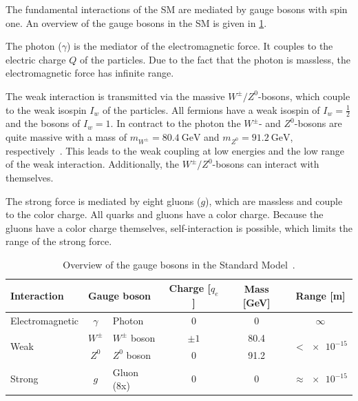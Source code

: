 The fundamental interactions of the SM are mediated by gauge bosons with spin one.
An overview of the gauge bosons in the SM is given in \cref{tab:theory:bosons}.

The photon ($\gamma$) is the mediator of the electromagnetic force.
It couples to the electric charge $Q$ of the particles.
Due to the fact that the photon is massless, the electromagnetic force has infinite range.

The weak interaction is transmitted via the massive $W^\pm/Z^0$-bosons, which couple to the weak isospin $I_w$ of the particles.
All fermions have a weak isospin of $I_w = \frac{1}{2}$ and the bosons of  $I_w = 1$.
In contract to the photon the $W^\pm$- and $Z^0$-bosons are quite massive with a mass of $m_{W^\pm} = \SI{80.4}{\GeV}$ and
$m_{Z^0} = \SI{91.2}{\GeV}$, respectively~\cite{PDG}.
This leads to the weak coupling at low energies and the low range of the weak interaction.
Additionally, the $W^\pm/Z^0$-bosons can interact with themselves.

The strong force is mediated by eight gluons ($g$), which are massless and couple to the color charge.
All quarks and gluons have a color charge.
Because the gluons have a color charge themselves, self-interaction is possible, which limits the range of the
strong force.

\begin{table}[htpb]
    \centering
    \caption{Overview of the gauge bosons in the Standard Model~\cite{PDG}.}\label{tab:theory:bosons}
    \begin{tabular}{lclccc}
        \toprule
        Interaction             & \multicolumn{2}{l}{Gauge boson}   & Charge [$q_e$]    & Mass [GeV] & Range [m] \\  \midrule
        Electromagnetic         & $\gamma$  & Photon                & $0$               & 0          & $\infty$                         \\ \cmidrule{1-6}
        \multirow{2}{*}{Weak}   & $W^\pm$   & $W^\pm$ boson         & $\pm 1$           & 80.4       & \multirow{2}{*}{$< \num{e-15}$}  \\
                                & $Z^0$     & $Z^0$ boson           & $0$               & 91.2       &                                  \\ \cmidrule{1-6}
        Strong                  & $g$       & Gluon (8x)            & $0$               & 0          & $\approx \num{e-15}$             \\
        \bottomrule
    \end{tabular}
\end{table}

